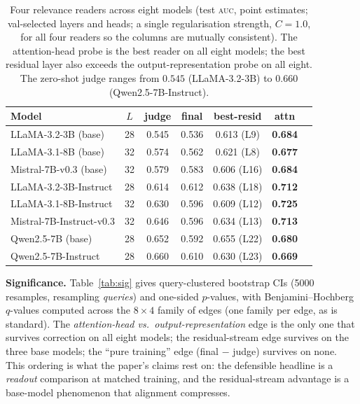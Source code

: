 \documentclass[11pt]{article}
\newcommand{\auc}{\textsc{auc}}
\begin{document}
\begin{table}[t]
\centering\small
\caption{Four relevance readers across eight models (test \auc, point
estimates; val-selected layers and heads; a single regularisation strength,
$C{=}1.0$, for all four readers so the columns are mutually consistent). The
attention-head probe is the best reader on all eight models; the best residual
layer also exceeds the output-representation probe on all eight. The zero-shot
judge ranges from $0.545$ (LLaMA-3.2-3B) to $0.660$ (Qwen2.5-7B-Instruct).}
\label{tab:main}
\begin{tabular}{lcccccc}
\toprule
Model & $L$ & judge & final & best-resid & attn \\
\midrule
LLaMA-3.2-3B (base)      & 28 & 0.545 & 0.536 & 0.613 (L9)  & \textbf{0.684} \\
LLaMA-3.1-8B (base)      & 32 & 0.574 & 0.562 & 0.621 (L8)  & \textbf{0.677} \\
Mistral-7B-v0.3 (base)   & 32 & 0.579 & 0.583 & 0.606 (L16) & \textbf{0.684} \\
LLaMA-3.2-3B-Instruct    & 28 & 0.614 & 0.612 & 0.638 (L18) & \textbf{0.712} \\
LLaMA-3.1-8B-Instruct    & 32 & 0.630 & 0.596 & 0.609 (L12) & \textbf{0.725} \\
Mistral-7B-Instruct-v0.3 & 32 & 0.646 & 0.596 & 0.634 (L13) & \textbf{0.713} \\
Qwen2.5-7B (base)        & 28 & 0.652 & 0.592 & 0.655 (L22) & \textbf{0.680} \\
Qwen2.5-7B-Instruct      & 28 & 0.660 & 0.610 & 0.630 (L23) & \textbf{0.669} \\
\bottomrule
\end{tabular}
\end{table}

\textbf{Significance.} Table~\ref{tab:sig} gives query-clustered bootstrap CIs
(5000 resamples, resampling \emph{queries}) and one-sided $p$-values, with
Benjamini--Hochberg $q$-values computed across the $8\times4$ family of edges
(one family per edge, as is standard). The \emph{attention-head
vs.\ output-representation} edge is the only one that survives correction on
all eight models; the residual-stream edge survives on the three base models;
the ``pure training'' edge (final $-$ judge) survives on none. This ordering
is what the paper's claims rest on: the defensible headline is a
\emph{readout} comparison at matched training, and the residual-stream
advantage is a base-model phenomenon that alignment compresses.
\end{document}
